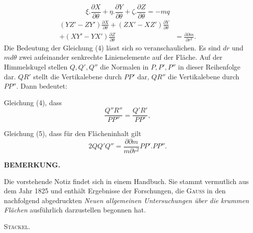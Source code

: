 %
\noindent [gilt:]
\begin{equation}\tag{4}
\xi.\frac{\partial X}{\partial\theta}+\eta.\frac{\partial Y}{\partial\theta}+\zeta.\frac{\partial Z}{\partial\theta}=-mq
\end{equation}
\noindent [und]
\begin{equation}\tag{5}
\begin{aligned}
(YZ'-ZY')\frac{\partial X}{\partial\theta}+(ZX'-XZ')\frac{\partial Y}{\partial\theta}&\\
+(XY'-YX')\frac{\partial Z}{\partial\theta}&=\frac{\partial\partial m}{\partial r^2}.
\end{aligned}
\end{equation}
\indent Die Bedeutung der Gleichung (4) lässt sich so veranschaulichen. Es sind $dr$ und $md\theta$ zwei aufeinander senkrechte Linienelemente auf der Fläche. Auf der Himmelskugel stellen $Q,Q',Q''$ die Normalen in $P,P',P''$ in dieser Reihenfolge dar. $QR'$ stellt die Vertikalebene durch $PP'$ dar, $QR''$ die Vertikalebene durch $PP''$. Dann bedeutet:
\begin{center}\end{center}
\noindent\hspace*{1.2em}Gleichung (4), dass
\[
\frac{Q''R''}{PP''}=\frac{Q'R'}{PP'},
\]
\begin{center}\end{center}
\noindent\hspace*{1.2em}Gleichung (5), dass für den Flächeninhalt gilt
\[
2QQ'Q''=\frac{\partial\partial m}{m\partial r^2}PP'.PP''.
\]
\par{}\begin{center}\textbf{BEMERKUNG.}\end{center}
\noindent\hspace*{1.2em}Die vorstehende Notiz findet sich in einem Handbuch. Sie stammt vermutlich aus dem Jahr 1825 und enthält Ergebnisse der Forschungen, die \textsc{Gauss} in den nachfolgend abgedruckten \textit{Neuen allgemeinen Untersuchungen über die krummen Flächen} ausführlich darzustellen begonnen hat.
\begin{flushright}\textsc{Stäckel}.\end{flushright}
